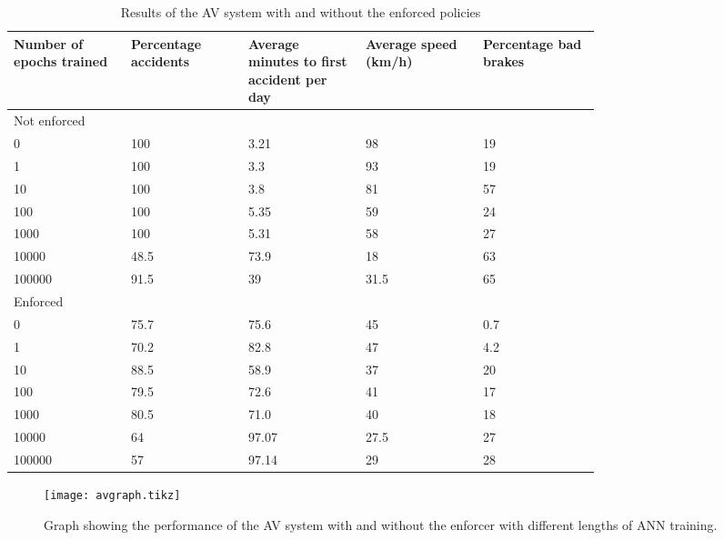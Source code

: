 \begin{table}[h]
	\centering
	\caption{Results of the AV system with and without the enforced policies}
	\label{table:avenf}
	\begin{tabular}{|p{0.15\linewidth}|p{0.15\linewidth}|p{0.15\linewidth}|p{0.15\linewidth}|p{0.15\linewidth}|}
		\hline Number of epochs trained & Percentage accidents & Average minutes to first accident per day & Average speed (km/h) & Percentage bad brakes \\ \hline
		\multicolumn{5}{|p{0.75\linewidth}|}{Not enforced} \\ \hline
		0 & 100	 & 3.21 & 98 & 19 \\ \hline
		1 & 100 & 3.3 & 93 & 19 \\ \hline
		10 & 100 & 3.8 & 81 & 57 \\ \hline
		100 & 100 & 5.35 & 59 & 24 \\ \hline
		1000 & 100 & 5.31 & 58 & 27 \\  \hline
		10000 & 48.5 & 73.9 & 18 & 63 \\ \hline
		100000 & 91.5 & 39 & 31.5 & 65 \\ \hline 
		\multicolumn{5}{|p{0.75\linewidth}|}{Enforced} \\ \hline
		0 & 75.7 & 75.6 & 45 & 0.7 \\ \hline 
		1 & 70.2 & 82.8 & 47 & 4.2 \\ \hline 
		10 & 88.5 & 58.9 & 37 & 20 \\ \hline 
		100 & 79.5 & 72.6 & 41 & 17 \\ \hline 
		1000 & 80.5 & 71.0 & 40 & 18 \\ \hline 
		10000 & 64 & 97.07 & 27.5 & 27 \\ \hline   
		100000 & 57 & 97.14 & 29 & 28 \\ \hline                  
	\end{tabular}
\end{table}

\begin{figure}[t]
	\centering
	\texttt{[image: avgraph.tikz]}
	\caption{Graph showing the performance of the AV system with and without the enforcer with different lengths of \ac{ANN} training. \label{fig:avtrained}}
\end{figure}

